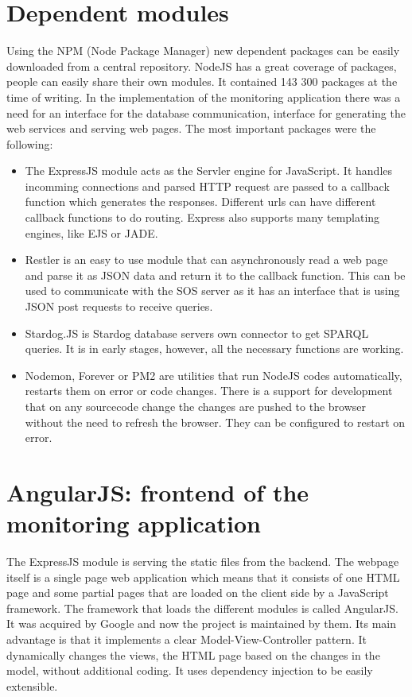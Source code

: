 \section{Dependent modules}

Using the NPM (Node Package Manager) new dependent packages can be easily downloaded from a central repository. NodeJS has a great coverage of packages, people can easily share their own modules. It contained 143 300 packages at the time of writing. In the implementation of the monitoring application there was a need for an interface for the database communication, interface for generating the web services and serving web pages. The most important packages were the following: 
\begin{itemize}

\item The ExpressJS module acts as the Servler engine for JavaScript. It handles incomming connections and parsed HTTP request are passed to a callback function which generates the responses. Different urls can have different callback functions to do routing. Express also supports many templating engines, like EJS or JADE.

\item Restler is an easy to use module that can asynchronously read a web page and parse it as JSON data and return it to the callback function. This can be used to communicate with the SOS server as it has an interface that is using JSON post requests to 
receive queries.

\item Stardog.JS is Stardog database servers own connector to get SPARQL queries. It is in early stages, however, all the necessary functions are working. 

\item Nodemon, Forever or PM2 are utilities that run NodeJS codes automatically, restarts them on error or code changes. There is a support for development that on any sourcecode change the changes are pushed to the browser without the need to refresh the browser. They can be configured to restart on error.
\end{itemize}

\section{AngularJS: frontend of the monitoring application}

The ExpressJS module is serving the static files from the backend. The webpage itself is a single page web application which means that it consists of one HTML page and some partial pages that are loaded on the client side by a JavaScript framework. The framework that loads the different modules is called AngularJS. It was acquired by Google and now the project is maintained by them\cite{angular}. Its main advantage is that it implements a clear Model-View-Controller pattern. It dynamically changes the views, the HTML page based on the changes in the model, without additional coding.
It uses dependency injection to be easily extensible.

